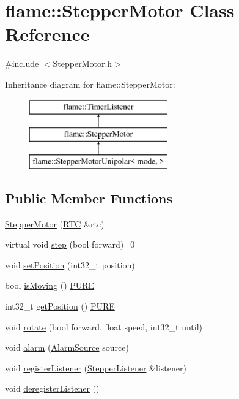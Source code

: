 \hypertarget{classflame_1_1_stepper_motor}{\section{flame\-:\-:Stepper\-Motor Class Reference}
\label{classflame_1_1_stepper_motor}
}


{\ttfamily \#include $<$Stepper\-Motor.\-h$>$}

Inheritance diagram for flame\-:\-:Stepper\-Motor\-:\begin{figure}[H]
\begin{center}
\leavevmode
\includegraphics[height=3.000000cm]{classflame_1_1_stepper_motor}
\end{center}
\end{figure}
\subsection*{Public Member Functions}
\begin{DoxyCompactItemize}
\item 
\hyperlink{classflame_1_1_stepper_motor_a17ca894e1297cb5d964c516dc8898fc0}{Stepper\-Motor} (\hyperlink{classflame_1_1_r_t_c}{R\-T\-C} \&rtc)
\item 
virtual void \hyperlink{classflame_1_1_stepper_motor_aab7e060d1704320b560657d912e791c9}{step} (bool forward)=0
\item 
void \hyperlink{classflame_1_1_stepper_motor_a260cf0be1a9c9d2ff362b8ad816b2c6c}{set\-Position} (int32\-\_\-t position)
\item 
bool \hyperlink{classflame_1_1_stepper_motor_ac86907c985c1f382e43790aa15e8c7a7}{is\-Moving} () \hyperlink{io_8h_acd42770aecb025cfac170d4d3ace4544}{P\-U\-R\-E}
\item 
int32\-\_\-t \hyperlink{classflame_1_1_stepper_motor_a69b9a3febce0c7e45c304fc5cea95165}{get\-Position} () \hyperlink{io_8h_acd42770aecb025cfac170d4d3ace4544}{P\-U\-R\-E}
\item 
void \hyperlink{classflame_1_1_stepper_motor_a5122f463d29b39e9bb9544a57cade8bf}{rotate} (bool forward, float speed, int32\-\_\-t until)
\item 
void \hyperlink{classflame_1_1_stepper_motor_a6eec1ffcfd13c4624525b4cabe1eec4c}{alarm} (\hyperlink{namespaceflame_a6d176ba245556716fd3e32006bb7cfe5}{Alarm\-Source} source)
\item 
void \hyperlink{classflame_1_1_stepper_motor_a2603e1dd71e15543bfb0a3c0d3a491f9}{register\-Listener} (\hyperlink{classflame_1_1_stepper_listener}{Stepper\-Listener} \&listener)
\item 
void \hyperlink{classflame_1_1_stepper_motor_a90e7ab11b511c68dea947465006ee0c6}{deregister\-Listener} ()
\end{DoxyCompactItemize}



